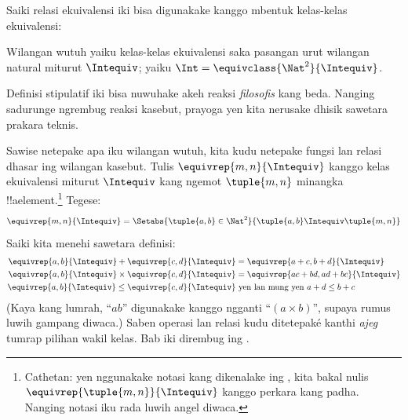 \documentclass[../../../include/open-logic-section]{subfiles}
\begin{document}
Saiki relasi ekuivalensi iki bisa digunakake kanggo mbentuk kelas-kelas ekuivalensi:

\begin{defn}
		Wilangan wutuh yaiku kelas-kelas ekuivalensi saka pasangan urut wilangan natural miturut $\Intequiv$; yaiku $\Int = \equivclass{\Nat^2}{\Intequiv}$.
\end{defn}

Definisi stipulatif iki bisa nuwuhake akeh reaksi \emph{filosofis} kang beda. Nanging sadurunge ngrembug reaksi kasebut, prayoga yen kita nerusake dhisik sawetara prakara teknis.

Sawise netepake apa iku wilangan wutuh, kita kudu netepake fungsi lan relasi dhasar ing wilangan kasebut. Tulis $\equivrep{m, n}{\Intequiv}$ kanggo kelas ekuivalensi miturut $\Intequiv$ kang ngemot $\tuple{m, n}$ minangka !!a{element}.\footnote{Cathetan: yen nggunakake notasi kang dikenalake ing , kita bakal nulis $\equivrep{\tuple{m,n}}{\Intequiv}$ kanggo perkara kang padha. Nanging notasi iku rada luwih angel diwaca.} Tegese:
	$$\equivrep{m, n}{\Intequiv} = \Setabs{\tuple{a, b} \in \Nat^2}{\tuple{a, b}\Intequiv \tuple{m, n}}$$
Saiki kita menehi sawetara definisi:
	\begin{align*}
		\equivrep{a, b}{\Intequiv} + \equivrep{c, d}{\Intequiv} &= \equivrep{a + c, b + d}{\Intequiv}\\
		\equivrep{a, b}{\Intequiv} \times \equivrep{c, d}{\Intequiv} &= \equivrep{a c + b  d, a  d + b c}{\Intequiv}\\
		\equivrep{a, b}{\Intequiv} \leq \equivrep{c, d}{\Intequiv} &\text{ yen lan mung yen }a + d \leq b + c
	\end{align*}
(Kaya kang lumrah, ``$ab$'' digunakake kanggo ngganti ``$(a \times b)$'', supaya rumus luwih gampang diwaca.) Saben operasi lan relasi kudu
ditetepaké kanthi \emph{ajeg} tumrap pilihan wakil kelas. Bab iki
dirembug ing .
\end{document}
